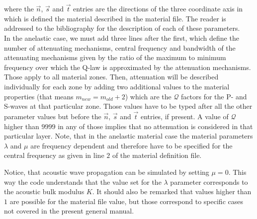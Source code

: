\documentclass[12pt,twoside]{article}
\def\Q{{\mathcal Q}}
\begin{document}
\noindent
where the $\vec n$, $\vec s$ and $\vec t$ entries are the directions of the three coordinate axis
in which is defined the material described in the material file.
The reader is addressed to the bibliography for the description of each of these parameters.\\

\noindent
In the anelastic case, we must add three lines after the first,
which define the number of attenuating mechanisms, central frequency and bandwidth of the attenuating mechanisms
given by the ratio of the maximum to minimum frequency over which the Q-law is approximated by the attenuation mechanisms.
Those apply to all material zones.
Then, attenuation will be described individually for each zone by adding two additional values to the material properties
(that means $m_{new}=m_{old}+2$) which are the $\Q$ factors for the P- and S-waves at that particular zone.
Those values have to be typed after all the other parameter values but before the $\vec n$, $\vec s$ and $\vec t$ entries, if present.
A value of $\Q$ higher than $9999$ in any of those implies that no attenuation is considered in that particular layer.
Note, that in the anelastic material case the material parameters $\lambda$ and $\mu$
are frequency dependent and therefore have to be specified for the central frequency as given in line $2$ of the
material definition file.

\noindent
Notice, that acoustic wave propagation can be simulated by setting $\mu=0$.
This way the code understands that the value set for the $\lambda$ parameter corresponds to the acoustic bulk modulus $K$.
It should also be remarked that values higher than $1$ are possible for the material file value,
but those correspond to specific cases not covered in the present general manual.
\end{document}

